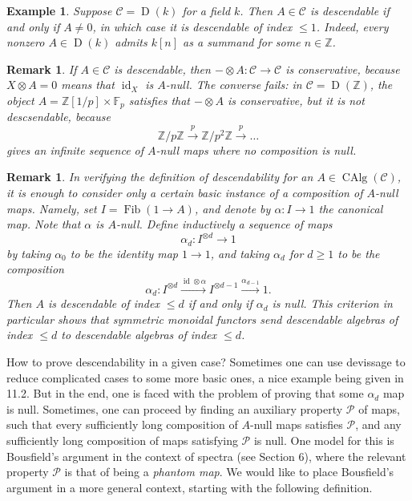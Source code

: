 \documentclass[12pt]{article}
\newtheorem{example}[theorem]{Example}
\newtheorem{remark}[theorem]{Remark}
\newcommand{\on}{\operatorname}
\begin{document}
\begin{example}
Suppose $\mathcal{C}=\on{D}(k)$ for a field $k$.  Then $A\in\mathcal{C}$ is descendable if and only if $A\neq 0$, in which case it is descendable of index $\leq 1$.  Indeed, every nonzero $A\in \on{D}(k)$ admits $k[n]$ as a summand for some $n\in\mathbb{Z}$.
\end{example}
\begin{remark}
If $A\in\mathcal{C}$ is descendable, then $-\otimes A:\mathcal{C}\to\mathcal{C}$ is conservative, because $X\otimes A=0$ means that $\on{id}_X$ is $A$-null.  The converse fails: in $\mathcal{C}=\on{D}(\mathbb{Z})$, the object $A=\mathbb{Z}[1/p]\times\mathbb{F}_p$ satisfies that $-\otimes A$ is conservative, but it is not descsendable, because
$$\mathbb{Z}/p\mathbb{Z}\overset{p}{\to}\mathbb{Z}/p^2\mathbb{Z}\overset{p}{\to} \ldots$$
gives an infinite sequence of $A$-null maps where no composition is null.
\end{remark}

\begin{remark}
In verifying the definition of descendability for an $A\in\on{CAlg}(\mathcal{C})$, it is enough to consider only a certain basic instance of a composition of $A$-null maps.  Namely, set $I=\on{Fib}(1\to A)$, and denote by $\alpha:I\to 1$ the canonical map.  Note that $\alpha$ is $A$-null.  Define inductively a sequence of maps
$$\alpha_d:I^{\otimes d}\to 1$$
by taking $\alpha_0$ to be the identity map $1\to 1$, and taking $\alpha_d$ for $d\geq 1$ to be the composition
$$\alpha_d: I^{\otimes d}\overset{\on{id}\otimes \alpha}{\longrightarrow}I^{\otimes d-1}\overset{\alpha_{d-1}}{\longrightarrow} 1.$$
Then $A$ is descendable of index $\leq d$ if and only if $\alpha_d$ is null.  This criterion in particular shows that symmetric monoidal functors send descendable algebras of index $\leq d$ to descendable algebras of index $\leq d$.
\end{remark}

How to prove descendability in a given case?  Sometimes one can use devissage to reduce complicated cases to some more basic ones, a nice example being given in \cite{BhattProjectivity} 11.2.  But in the end, one is faced with the problem of proving that some $\alpha_d$ map is null.  Sometimes, one can proceed by finding an auxiliary property $\mathcal{P}$ of maps, such that every sufficiently long composition of $A$-null maps satisfies $\mathcal{P}$, and any sufficiently long composition of maps satisfying $\mathcal{P}$ is null.  One model for this is Bousfield's argument in the context of spectra (see \cite{BousfieldLocalization} Section 6), where the relevant property $\mathcal{P}$ is that of being a \emph{phantom map}.  We would like to place Bousfield's argument in a more general context, starting with the following definition.
\end{document}
